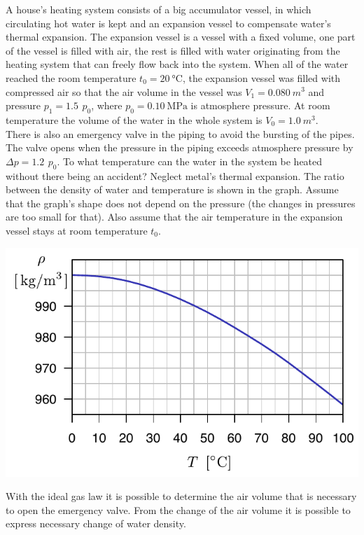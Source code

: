 A house’s heating system consists of a big accumulator vessel, in which circulating hot water is kept and an expansion vessel to compensate water’s thermal expansion. The expansion vessel is a vessel with a fixed volume, one part of the vessel is filled with air, the rest is filled with water originating from the heating system that can freely flow back into the system. When all of the water reached the room temperature $t_0=\SI{20}{\degreeCelsius}$, the expansion vessel was filled with compressed air so that the air volume in the vessel was $V_1=\SI{0.080}{m^3}$ and pressure $p_1=\SI{1.5}{}\,p_0$, where $p_0=\SI{0.10}{\mega\pascal}$ is atmosphere pressure. At room temperature the volume of the water in the whole system is $V_0=\SI{1.0}{m^3}$.\\
There is also an emergency valve in the piping to avoid the bursting of the pipes. The valve opens when the pressure in the piping exceeds atmosphere pressure by $\Delta p = \SI{1.2}{} \, p_0 $. To what temperature can the water in the system be heated without there being an accident? Neglect metal’s thermal expansion. The ratio between the density of water and temperature is shown in the graph. Assume that the graph’s shape does not depend on the pressure (the changes in pressures are too small for that). Also assume that the air temperature in the expansion vessel stays at room temperature $t_0$.
\begin{center}
\includegraphics[width=0.8\linewidth]{2014-v3g-03-veeTihedus}
\end{center}

\hinteng
With the ideal gas law it is possible to determine the air volume that is necessary to open the emergency valve. From the change of the air volume it is possible to express necessary change of water density.


